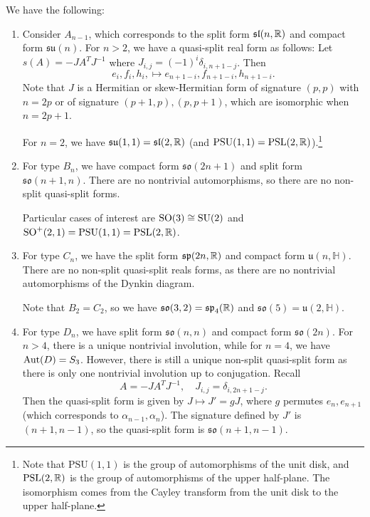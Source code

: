 \begin{example}
  We have the following:
  \begin{enumerate}
    \item Consider $A_{n - 1}$,
      which corresponds to the
      split form $\mathfrak{sl}(n, \mathbb{R})$
      and compact form $\mathfrak{su}(n)$.
      For $n > 2$, we have a quasi-split
      real form as follows: Let
      $s(A) = -J A^T J^{-1}$ where
      $J_{i, j} = (-1)^i \delta_{i, n + 1 - j}$.
      Then
      \[
        e_i, f_i, h_i,
        \longmapsto
        e_{n + 1 - i}, f_{n + 1 - i}, h_{n + 1 - i}.
      \]
      Note that $J$ is a Hermitian or
      skew-Hermitian form of signature $(p, p)$
      with $n = 2p$ or of signature
      $(p + 1, p), (p, p + 1)$,
      which are isomorphic
      when $n = 2p + 1$.

      For $n = 2$, we have
      $\mathfrak{su}(1, 1) = \mathfrak{sl}(2, \mathbb{R})$
      (and
      $\mathrm{PSU}(1, 1) = \operatorname{PSL}(2, \mathbb{R})$).\footnote{Note that $\mathrm{PSU}(1, 1)$ is the group of automorphisms of the unit disk, and $\operatorname{PSL}(2, \mathbb{R})$ is the group of automorphisms of the upper half-plane. The isomorphism comes from the Cayley transform from the unit disk to the upper half-plane.}
    \item For type $B_n$, we have
      compact form $\mathfrak{so}(2n + 1)$
      and split form $\mathfrak{so}(n + 1, n)$.
      There are no nontrivial automorphisms,
      so there are no non-split quasi-split
      forms.

      Particular cases of interest are
      $\operatorname{SO}(3) \cong \operatorname{SU}(2)$ and
      $\operatorname{SO}^+(2, 1) = \mathrm{PSU}(1, 1) = \operatorname{PSL}(2, \mathbb{R})$.
    \item For type $C_n$, we have the
      split form $\mathfrak{sp}(2n, \mathbb{R})$ and
      compact form $\mathfrak{u}(n, \mathbb{H})$.
      There are no non-split quasi-split
      reals forms, as there are no
      nontrivial automorphisms
      of the Dynkin diagram.

      Note that $B_2 = C_2$, so we have
      $\mathfrak{so}(3, 2) = \mathfrak{sp}_4(\mathbb{R})$
      and $\mathfrak{so}(5) = \mathfrak{u}(2, \mathbb{H})$.
    \item For type $D_n$, we have split form
      $\mathfrak{so}(n, n)$ and compact form
      $\mathfrak{so}(2n)$. For $n > 4$,
      there is a unique nontrivial involution,
      while for $n = 4$, we have $\operatorname{Aut}(D) = S_3$.
      However, there is still a unique
      non-split quasi-split form as
      there is only one nontrivial involution
      up to conjugation. Recall
      \[
        A = -J A^T J^{-1}, \quad
        J_{i, j} = \delta_{i, 2n + 1 - j}.
      \]
      Then the quasi-split form
      is given by $J \mapsto J' = gJ$,
      where $g$ permutes $e_n, e_{n + 1}$
      (which corresponds to $\alpha_{n - 1}, \alpha_n$).
      The signature defined by $J'$ is
      $(n + 1, n - 1)$, so the
      quasi-split form is
      $\mathfrak{so}(n + 1, n - 1)$.


\end{enumerate}
\end{example}
